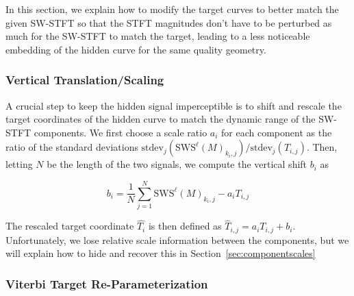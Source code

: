 \documentclass[runningheads]{llncs}
\begin{document}
In this section, we explain how to modify the target curves to better match the given SW-STFT so that the STFT magnitudes don't have to be perturbed as much for the SW-STFT to match the target, leading to a less noticeable embedding of the hidden curve for the same quality geometry.

\subsubsection{Vertical Translation/Scaling}

A crucial step to keep the hidden signal imperceptible is to shift and rescale the target coordinates of the hidden curve to match the dynamic range of the SW-STFT components.  We first choose a scale ratio $a_i$ for each component as the ratio of the standard deviations $\text{stdev}_j \left( \text{SWS}^{\ell} (M)_{k_i, j} \right) / \text{stdev}_j (T_{i, j})$.  Then, letting $N$ be the length of the two signals, we compute the vertical shift $b_i$ as

\begin{equation}
  b_i = \frac{1}{N} \sum_{j=1}^N  \text{SWS}^{\ell} (M)_{k_i, j} - a_i T_{i, j}
\end{equation}

The rescaled target coordinate $\hat{T_i}$ is then defined as $\hat{T}_{i, j} = a_i T_{i, j} + b_i$.  Unfortunately, we lose relative scale information between the components, but we will explain how to hide and recover this in Section~\ref{sec:componentscales}

\subsubsection{Viterbi Target Re-Parameterization}
\end{document}
